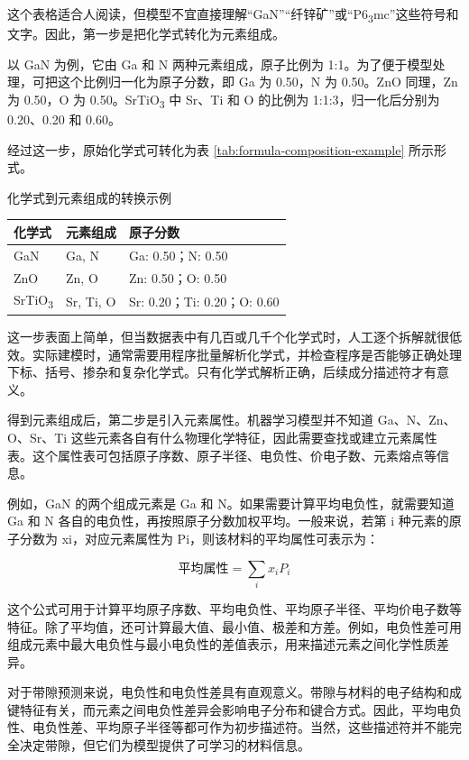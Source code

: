 这个表格适合人阅读，但模型不宜直接理解“GaN”“纤锌矿”或“P6\textsubscript{3}mc”这些符号和文字。因此，第一步是把化学式转化为元素组成。


以 GaN 为例，它由 Ga 和 N 两种元素组成，原子比例为 1:1。为了便于模型处理，可把这个比例归一化为原子分数，即 Ga 为 0.50，N 为 0.50。ZnO 同理，Zn 为 0.50，O 为 0.50。SrTiO\textsubscript{3} 中 Sr、Ti 和 O 的比例为 1:1:3，归一化后分别为 0.20、0.20 和 0.60。


经过这一步，原始化学式可转化为表 \ref{tab:formula-composition-example} 所示形式。


\begin{formalTable}[htbp]
\caption{化学式到元素组成的转换示例}
\label{tab:formula-composition-example}
\begin{tabularx}{\textwidth}{@{}YYY@{}}
\toprule
\textbf{化学式} & \textbf{元素组成} & \textbf{原子分数} \\
\midrule
GaN & Ga, N & Ga: 0.50；N: 0.50 \\
ZnO & Zn, O & Zn: 0.50；O: 0.50 \\
SrTiO\textsubscript{3} & Sr, Ti, O & Sr: 0.20；Ti: 0.20；O: 0.60 \\
\bottomrule
\end{tabularx}
\end{formalTable}

这一步表面上简单，但当数据表中有几百或几千个化学式时，人工逐个拆解就很低效。实际建模时，通常需要用程序批量解析化学式，并检查程序是否能够正确处理下标、括号、掺杂和复杂化学式。只有化学式解析正确，后续成分描述符才有意义。


得到元素组成后，第二步是引入元素属性。机器学习模型并不知道 Ga、N、Zn、O、Sr、Ti 这些元素各自有什么物理化学特征，因此需要查找或建立元素属性表。这个属性表可包括原子序数、原子半径、电负性、价电子数、元素熔点等信息。


例如，GaN 的两个组成元素是 Ga 和 N。如果需要计算平均电负性，就需要知道 Ga 和 N 各自的电负性，再按照原子分数加权平均。一般来说，若第 i 种元素的原子分数为 xi，对应元素属性为 Pi，则该材料的平均属性可表示为：


\begin{equation*}\text{平均属性}=\sum_i x_i P_i\end{equation*}

这个公式可用于计算平均原子序数、平均电负性、平均原子半径、平均价电子数等特征。除了平均值，还可计算最大值、最小值、极差和方差。例如，电负性差可用组成元素中最大电负性与最小电负性的差值表示，用来描述元素之间化学性质差异。


对于带隙预测来说，电负性和电负性差具有直观意义。带隙与材料的电子结构和成键特征有关，而元素之间电负性差异会影响电子分布和键合方式。因此，平均电负性、电负性差、平均原子半径等都可作为初步描述符。当然，这些描述符并不能完全决定带隙，但它们为模型提供了可学习的材料信息。


